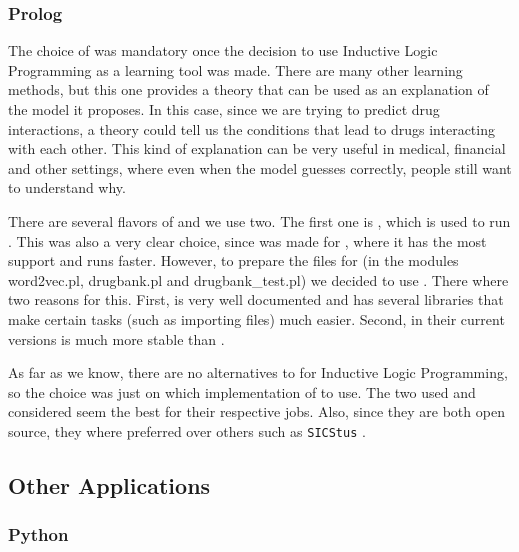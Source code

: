 \documentclass[12pt, openany]{book}
\begin{document}
\subsubsection{Prolog}

The choice of \prolog was mandatory once the decision to use Inductive Logic Programming as a learning tool was made. There are many other learning methods, but this one provides a theory that can be used as an explanation of the model it proposes. In this case, since we are trying to predict drug interactions, a theory could tell us the conditions that lead to drugs interacting with each other. This kind of explanation can be very useful in medical, financial and other settings, where even when the model guesses correctly, people still want to understand why.

There are several flavors of \prolog and we use two. The first one is \yap, which is used to run \alephilp. This was also a very clear choice, since \alephilp was made for \yap, where it has the most support and runs faster. However, to prepare the files for \alephilp (in the modules word2vec.pl, drugbank.pl and drugbank\_test.pl) we decided to use \swi. There where two reasons for this. First, \swi is very well documented and has several libraries that make certain tasks (such as importing \xml files) much easier. Second, in their current versions \swi is much more stable than \yap.

As far as we know, there are no alternatives to \prolog for Inductive Logic Programming, so the choice was just on which implementation of \prolog to use. The two used and considered seem the best for their respective jobs. Also, since they are both open source, they where preferred over others such as \texttt{SICStus} \prolog.

\subsection{Other Applications}

\subsubsection{Python}
\end{document}
